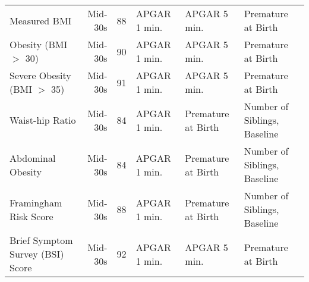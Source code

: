 \begin{tabular}{l r r l l l}
 Measured BMI	&	Mid-30s	&	88	&	APGAR 1 min. & APGAR 5 min. & Premature at Birth \\
 Obesity (BMI $>$ 30)	&	Mid-30s	&	90	&	APGAR 1 min. & APGAR 5 min. & Premature at Birth \\
 Severe Obesity (BMI $>$ 35)	&	Mid-30s	&	91	&	APGAR 1 min. & APGAR 5 min. & Premature at Birth \\
 Waist-hip Ratio	&	Mid-30s	&	84	& APGAR 1 min. & Premature at Birth & Number of Siblings, Baseline \\
 Abdominal Obesity	&	Mid-30s	&	84	& APGAR 1 min. & Premature at Birth & Number of Siblings, Baseline \\
 Framingham Risk Score	&	Mid-30s	&	88	& APGAR 1 min. & Premature at Birth & Number of Siblings, Baseline \\
 Brief Symptom Survey (BSI) Score & Mid-30s & 92 &	APGAR 1 min. & APGAR 5 min. & Premature at Birth	\\
\bottomrule											
\end{tabular}